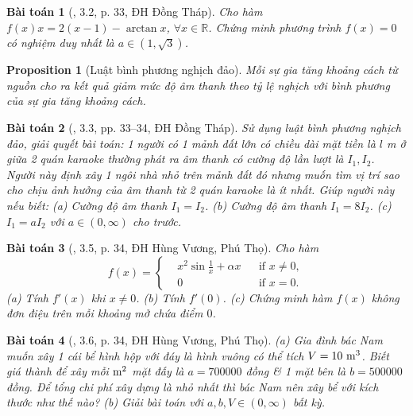\documentclass{article}
\newtheorem{baitoan}{Bài toán}
\newtheorem{proposition}{Proposition}
\begin{document}
\begin{baitoan}[\cite{VMS_VMC2023}, 3.2, p. 33, ĐH Đồng Tháp]
	Cho hàm $f(x)x = 2(x - 1) - \arctan x$, $\forall x\in\mathbb{R}$. Chứng minh phương trình $f(x) = 0$ có nghiệm duy nhất là $a\in(1,\sqrt{3})$.
\end{baitoan}

\begin{proposition}[Luật bình phương nghịch đảo]
	Mỗi sự gia tăng khoảng cách từ nguồn cho ra kết quả giảm mức độ âm thanh theo tỷ lệ nghịch với bình phương của sự gia tăng khoảng cách.
\end{proposition}

\begin{baitoan}[\cite{VMS_VMC2023}, 3.3, pp. 33--34, ĐH Đồng Tháp]
	Sử dụng luật bình phương nghịch đảo, giải quyết bài toán: 1 người có 1 mảnh đất lớn có chiều dài mặt tiền là $l$ {\rm m} ở giữa 2 quán karaoke thường phát ra âm thanh có cường độ lần lượt là $I_1,I_2$. Người này định xây 1 ngôi nhà nhỏ trên mảnh đất đó nhưng muốn tìm vị trí sao cho chịu ảnh hưởng của âm thanh từ 2 quán karaoke là ít nhất. Giúp người này nếu biết: (a) Cường độ âm thanh $I_1 = I_2$. (b) Cường độ âm thanh $I_1 = 8I_2$. (c) $I_1 = aI_2$ với $a\in(0,\infty)$ cho trước.
\end{baitoan}

\begin{baitoan}[\cite{VMS_VMC2023}, 3.5, p. 34, ĐH Hùng Vương, Phú Thọ]
	Cho hàm
	\begin{equation*}
		f(x) = \left\{\begin{split}
			&x^2\sin\frac{1}{x} + \alpha x&&\mbox{if } x\ne0,\\
			&0&&\mbox{if } x = 0.
		\end{split}\right.
	\end{equation*}
	(a) Tính $f'(x)$ khi $x\ne0$. (b) Tính $f'(0)$. (c) Chứng minh hàm $f(x)$ không đơn điệu trên mỗi khoảng mở chứa điểm $0$.
\end{baitoan}

\begin{baitoan}[\cite{VMS_VMC2023}, 3.6, p. 34, ĐH Hùng Vương, Phú Thọ]
	(a) Gia đình bác Nam muốn xây 1 cái bể hình hộp với đáy là hình vuông có thể tích $V = 10\ {\rm m}^3$. Biết giá thành để xây mỗi $\rm m^2$ mặt đấy là $a = 700000$ đồng \& 1 mặt bên là $b = 500000$ đồng. Để tổng chi phí xây dựng là nhỏ nhất thì bác Nam nên xây bể với kích thước như thế nào? (b) Giải bài toán với $a,b,V\in(0,\infty)$ bất kỳ.
\end{baitoan}
\end{document}
